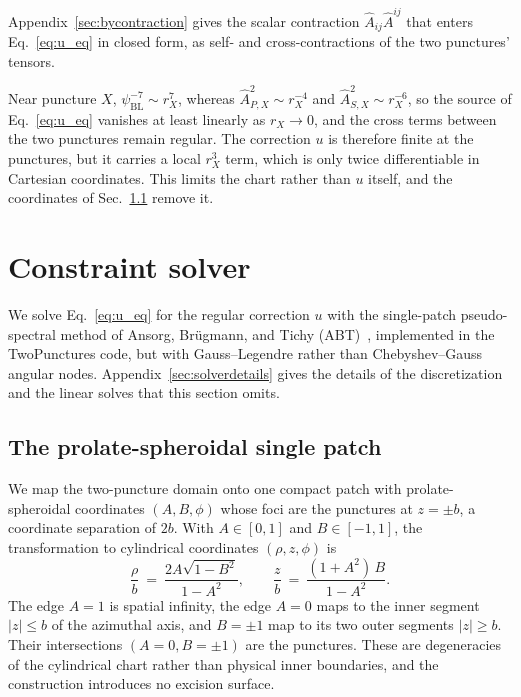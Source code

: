 \documentclass[
  aps,
  prd,
  twocolumn,
  10pt,
  amsmath,
  amssymb,
  nofootinbib,
  superscriptaddress,
  floatfix,
]{revtex4-2}
\newcommand{\psiBL}{\psi_{\mathrm{BL}}}
\newcommand{\Ahat}{\hat{A}}
\begin{document}
Appendix~\ref{sec:bycontraction} gives the scalar contraction $\Ahat_{ij}\Ahat^{ij}$ that enters Eq.~\eqref{eq:u_eq} in closed form, as self- and cross-contractions of the two punctures' tensors.


Near puncture $X$, $\psiBL^{-7}\sim r_X^7$, whereas $\Ahat_{P,X}^2\sim r_X^{-4}$ and $\Ahat_{S,X}^2\sim r_X^{-6}$, so the source of Eq.~\eqref{eq:u_eq} vanishes at least linearly as $r_X\to0$, and the cross terms between the two punctures remain regular.
The correction $u$ is therefore finite at the punctures, but it carries a local $r_X^3$ term, which is only twice differentiable in Cartesian coordinates.
This limits the chart rather than $u$ itself, and the coordinates of Sec.~\ref{sec:solve:abt} remove it.



\section{Constraint solver}
\label{sec:solve}
We solve Eq.~\eqref{eq:u_eq} for the regular correction $u$ with the single-patch pseudo-spectral method of Ansorg, Br\"ugmann, and Tichy (ABT)~\cite{AnsorgBruegmannTichy2004}, implemented in the TwoPunctures code, but with Gauss--Legendre rather than Chebyshev--Gauss angular nodes.
Appendix~\ref{sec:solverdetails} gives the details of the discretization and the linear solves that this section omits.


\subsection{The prolate-spheroidal single patch}
\label{sec:solve:abt}

We map the two-puncture domain onto one compact patch with prolate-spheroidal coordinates $(A,B,\phi)$ whose foci are the punctures at $z=\pm b$, a coordinate separation of $2b$.
With $A\in[0,1]$ and $B\in[-1,1]$, the transformation to cy\-lindrical coordinates $(\rho,z,\phi)$ is
\begin{equation}
  \frac{\rho}{b} \ = \ \frac{2A\sqrt{1-B^2}}{1-A^2}, \qquad
  \frac{z}{b}    \ = \ \frac{(1+A^2)\,B}{1-A^2}.
  \label{eq:abt_map}
\end{equation}
The edge $A=1$ is spatial infinity, the edge $A=0$ maps to the inner segment $|z|\le b$ of the azimuthal axis, and $B=\pm1$ map to its two outer segments $|z|\ge b$.
Their intersections $(A=0,B=\pm1)$ are the punctures.
These are degeneracies of the cylindrical chart rather than physical inner boundaries, and the construction introduces no excision surface.
\end{document}
